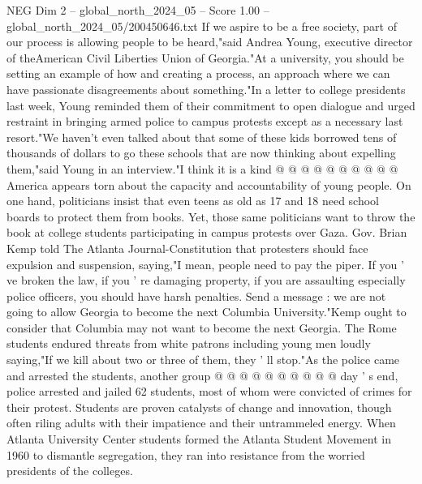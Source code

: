 \begin{textsample}{NEG Dim 2 – global\_north\_2024\_05 – Score 1.00 – global\_north\_2024\_05/200450646.txt}
If we aspire to be a free society, part of our process is allowing people to be heard,"said Andrea Young, executive director of theAmerican Civil Liberties Union of Georgia."At a university, you should be setting an example of how and creating a process, an approach where we can have passionate disagreements about something."In a letter to college presidents last week, Young reminded them of their commitment to open dialogue and urged restraint in bringing armed police to campus protests except as a necessary last resort."We haven't even talked about that some of these kids borrowed tens of thousands of dollars to go these schools that are now thinking about expelling them,"said Young in an interview."I think it is a kind @ @ @ @ @ @ @ @ @ @ America appears torn about the capacity and accountability of young people.
On one hand, politicians insist that even teens as old as 17 and 18 need school boards to protect them from books.
Yet, those same politicians want to throw the book at college students participating in campus protests over Gaza.
Gov.
Brian Kemp told The Atlanta Journal-Constitution that protesters should face expulsion and suspension, saying,"I mean, people need to pay the piper.
If you ' ve broken the law, if you ' re damaging property, if you are assaulting especially police officers, you should have harsh penalties.
Send a message : we are not going to allow Georgia to become the next Columbia University."Kemp ought to consider that Columbia may not want to become the next Georgia.
The Rome students endured threats from white patrons including young men loudly saying,"If we kill about two or three of them, they ' ll stop."As the police came and arrested the students, another group @ @ @ @ @ @ @ @ @ @ day ' s end, police arrested and jailed 62 students, most of whom were convicted of crimes for their protest.
Students are proven catalysts of change and innovation, though often riling adults with their impatience and their untrammeled energy.
When Atlanta University Center students formed the Atlanta Student Movement in 1960 to dismantle segregation, they ran into resistance from the worried presidents of the colleges.

\end{textsample}
